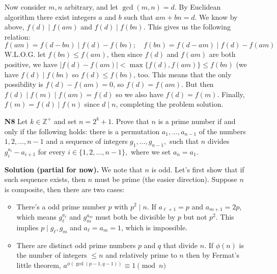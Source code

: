 \documentclass[11pt,a4paper]{article}
\begin{document}
\begin{enumerate}
	Now consider $m, n$ arbitrary, and let $\gcd(m, n)=d$. By Euclidean algorithm there exist integers $a$ and $b$ such that $am+bn=d$. We know by above, $f(d)\mid f(am)$ and $f(d)\mid f(bn)$. This gives us the following relation: 
	\[f(am)=f(d-bn)\mid f(d)-f(bn);\quad
	  f(bn)=f(d-am)\mid f(d)-f(am)
	\]
	W.L.O.G. let $f(bn)\le f(am)$, then since $f(d)$ and $f(am)$ are both positive, we have $|f(d)-f(am)|<\max\{f(d), f(am)\}\le f(bn)$ (we have $f(d)\mid f(bn)$ so $f(d)\le f(bn)$, too. This means that the only possibility is $f(d)-f(am)=0$, so $f(d)=f(am)$. But then $f(d)\mid f(m)\mid f(am)=f(d)$ so we also have $f(d)=f(m)$. Finally, $f(m)=f(d)\mid f(n)$ since $d\mid n$, completing the problem solution. 
	
	\item [\textbf{N8}] Let $k \in \mathbb{Z}^+$ and set $n=2^k+1.$ Prove that $n$ is a prime number if and only if the following holds: there is a permutation $a_{1},\ldots,a_{n-1}$ of the numbers $1,2, \ldots, n-1$ and a sequence of integers $g_{1},\ldots,g_{n-1},$ such that $n$ divides $g^{a_i}_i - a_{i+1}$ for every $i \in \{1,2,\ldots,n-1\},$ where we set $a_n = a_1.$
	
	\textbf{Solution (partial for now).}
	We note that $n$ is odd. 
	Let's first show that if such sequence exists, then $n$ must be prime (the easier direction). 
	Suppose $n$ is composite, then there are two cases: 
	\begin{itemize}
		\item There's a odd prime number $p$ with $p^2\mid n$. 
		If $a_{\ell+1}=p$ and $a_{m+1}=2p$, which means $g_{\ell}^{a_{\ell}}$ and $g_m^{a_m}$ must both be divisible by $p$ but not $p^2$. This implies $p\mid g_{\ell}, g_m$ and $a_{\ell}=a_m=1$, which is impossible. 
		
		\item There are distinct odd prime numbers $p$ and $q$ that divide $n$. 
		If $\phi(n)$ is the number of integers $\le n$ and relatively prime to $n$ then 
		by Fermat's little theorem, $a^{\phi(\gcd(p-1, q-1))}\equiv 1\pmod{n}$
	\end{itemize}
	
\end{enumerate}
\end{document}
